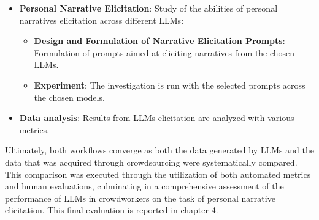 \begin{itemize}
\begin{itemize}
\begin{itemize}
            \end{itemize}
            \item \textbf{Personal Narrative Elicitation}: Study of the abilities of personal narratives elicitation across different LLMs:
            \begin{itemize}
                \item \textbf{Design and Formulation of Narrative Elicitation Prompts}: Formulation of prompts aimed at eliciting narratives from the chosen LLMs.
                \item \textbf{Experiment}: The investigation is run with the selected prompts across the chosen models.
            \end{itemize}
            \item \textbf{Data analysis}: Results from LLMs elicitation are analyzed with various metrics.
        \end{itemize}
\end{itemize}
Ultimately, both workflows converge as both the data generated by LLMs and the data that was acquired through crowdsourcing were systematically compared. This comparison was executed through the utilization of both automated metrics and human evaluations, culminating in a comprehensive assessment of the performance of LLMs in crowdworkers on the task of personal narrative elicitation. This final evaluation is reported in chapter 4.
